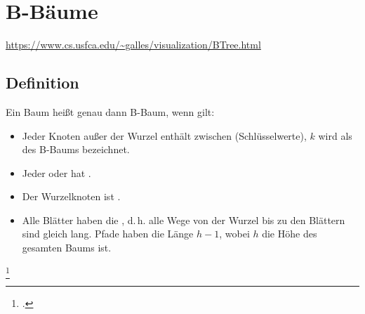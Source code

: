 \documentclass{lehramt-informatik}
\begin{document}

\chapter{B-Bäume}

\begin{quellen}
\item \cite{wiki:bbaum}
\item \cite[Kapitel 14.4.3, Seite 386-399 (PDF 402-415)]{saake}
\item \cite[Kapitel 13.5.4.2 Balancierte Mehrwegbäume, Seite 464, wird
nur erwähnt, nicht beschrieben]{schneider}
\end{quellen}

\url{https://www.cs.usfca.edu/~galles/visualization/BTree.html}

%

\section{Definition}

Ein Baum heißt genau dann B-Baum, wenn gilt:
%

\begin{itemize}
\item Jeder Knoten außer der Wurzel enthält zwischen  (Schlüsselwerte), $k$ wird als  des B-Baums
bezeichnet.
%
\item Jeder  oder hat
.
%
\item Der Wurzelknoten ist .
%
\item Alle Blätter haben die , d.\,h. alle Wege von
der Wurzel bis zu den Blättern sind gleich lang. Pfade haben die Länge
$h-1$, wobei $h$ die Höhe des gesamten Baums ist.
\end{itemize}

\footcite[Seite 32 (PDF 26)]{aud:fs:5}

%
\end{document}
